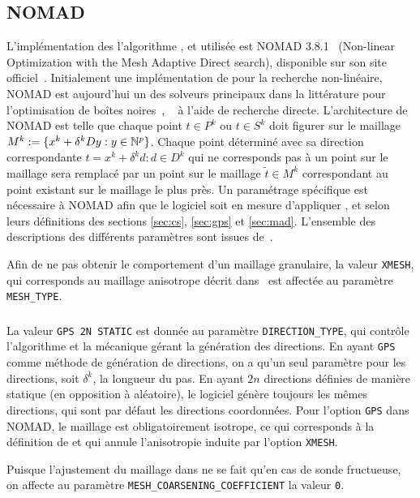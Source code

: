 \subsection{NOMAD}\label{sec:nom}
L'implémentation des l'algorithme \CS, \GPS et \MADS utilisée est NOMAD 3.8.1~\cite{Le09b} (Non-linear Optimization with the Mesh Adaptive Direct search), disponible sur son site officiel~\cite{AuCo04a}. Initialement une implémentation de \MADS pour la recherche non-linéaire, NOMAD est aujourd'hui un des solveurs principaux dans la littérature pour l'optimisation de boîtes noires~\cite{CoScVibook}, ~\cite{RiSa2010} à l'aide de recherche directe. L'architecture de NOMAD est telle que chaque point $t \in P^k$ ou $t \in S^k$ doit figurer sur le maillage $M^k:=\{x^k+\delta^kDy:y\in \mathbb{N}^p\}$. Chaque point déterminé avec sa direction correspondante $t = x^k + \delta^k d : d \in D^k$ qui ne corresponds pas à un point sur le maillage sera remplacé par un point sur le maillage $\tilde{t} \in M^k$ correspondant au point existant sur le maillage le plus près. Un paramétrage spécifique est nécessaire à NOMAD afin que le logiciel soit en mesure d'appliquer \CS, \GPS et \MADS selon leurs définitions des sections \ref{sec:cs}, \ref{sec:gps} et \ref{sec:mad}. L'ensemble des descriptions des différents paramètres sont issues de~\cite{Le09a}.   
  
Afin de ne pas obtenir le comportement d'un maillage granulaire, la valeur \texttt{XMESH}, qui corresponds au maillage anisotrope décrit dans~\cite{AuLedTr2014} est affectée au paramètre \texttt{MESH\_TYPE}.
\subsubsection{\CS}\label{sec:ncs}
La valeur \texttt{GPS 2N STATIC} est donnée au paramètre \texttt{DIRECTION\_TYPE}, qui contrôle l'algorithme et la mécanique gérant la génération des directions. En ayant \texttt{GPS} comme méthode de génération de directions, on a qu'un seul paramètre pour les directions, soit $\delta^k$, la longueur du pas. En ayant $2n$ directions définies de manière statique (en opposition à aléatoire), le logiciel génère toujours les mêmes directions, qui sont par défaut les directions coordonnées. Pour l'option \texttt{GPS} dans NOMAD, le maillage est obligatoirement isotrope, ce qui corresponds à la définition de \CS et qui annule l'anisotropie induite par l'option \texttt{XMESH}. 
 
Puisque l'ajustement du maillage dans \CS ne se fait qu'en cas de sonde fructueuse, on affecte au paramètre \texttt{MESH\_COARSENING\_COEFFICIENT} la valeur \texttt{0}.  
  
